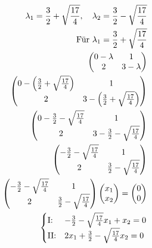 \begin{align*}
    \lambda_1 = \frac{3}{2} + \sqrt{\frac{17}{4}}, \quad \lambda_2 = \frac{3}{2} - \sqrt{\frac{17}{4}} \\
    \text{Für } \lambda_1 = \frac{3}{2} + \sqrt{\frac{17}{4}} \\
    \begin{pmatrix}
        0 - \lambda & 1 \\
        2 & 3 - \lambda
    \end{pmatrix} \\
    \begin{pmatrix}
        0 - \left(\frac{3}{2} + \sqrt{\frac{17}{4}}\right) & 1 \\
        2 & 3 - \left(\frac{3}{2} + \sqrt{\frac{17}{4}}\right)
    \end{pmatrix} \\
    \begin{pmatrix}
        0 - \frac{3}{2} - \sqrt{\frac{17}{4}} & 1 \\
        2 & 3 -\frac{3}{2} - \sqrt{\frac{17}{4}}
    \end{pmatrix} \\
    \begin{pmatrix}
        -\frac{3}{2} - \sqrt{\frac{17}{4}} & 1 \\
        2 & \frac{3}{2} - \sqrt{\frac{17}{4}}
    \end{pmatrix} \\
    \begin{pmatrix}
        -\frac{3}{2} - \sqrt{\frac{17}{4}} & 1 \\
        2 & \frac{3}{2} - \sqrt{\frac{17}{4}}
    \end{pmatrix} \begin{pmatrix}
        x_1 \\ x_2
    \end{pmatrix} = \begin{pmatrix}
        0 \\ 0
    \end{pmatrix}\\
    \begin{cases}
        \text{I:\@} & -\frac{3}{2} - \sqrt{\frac{17}{4}}x_1 + x_2 = 0 \\
        \text{II:\@} & 2x_1 + \frac{3}{2} - \sqrt{\frac{17}{4}}x_2 = 0
    \end{cases}
\end{align*}

